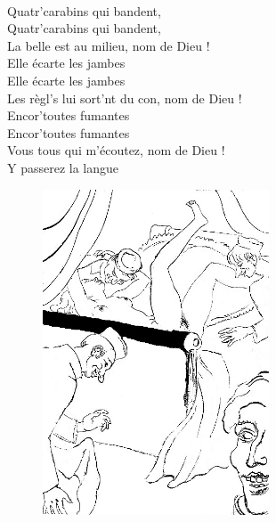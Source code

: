 \\Quatr'carabins qui bandent, 
\\
{Quatr'carabins qui bandent,}
\\La belle est au milieu, nom de Dieu !
\\Elle écarte les jambes 
\\
{Elle écarte les jambes }
\\Les règl's lui sort'nt du con, nom de Dieu !
\\Encor'toutes fumantes 
\\
{Encor'toutes fumantes }
\\Vous tous qui m'écoutez, nom de Dieu !
\\Y passerez la langue 
\begin{figure}[h!]
\centering
   \includegraphics[width=0.6\textwidth]{images/ChansonHotelDieu.jpg}
 \end{figure}
\breakpage

